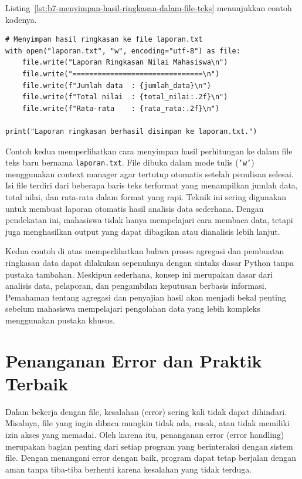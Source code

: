 Listing~\ref{lst:b7-menyimpan-hasil-ringkasan-dalam-file-teks} menunjukkan contoh kodenya.

\begin{lstlisting}[style=PythonStyle, caption={Menyimpan hasil ringkasan dalam file teks terformat}, label={lst:b7-menyimpan-hasil-ringkasan-dalam-file-teks}]
# Menyimpan hasil ringkasan ke file laporan.txt
with open("laporan.txt", "w", encoding="utf-8") as file:
    file.write("Laporan Ringkasan Nilai Mahasiswa\n")
    file.write("===============================\n")
    file.write(f"Jumlah data  : {jumlah_data}\n")
    file.write(f"Total nilai  : {total_nilai:.2f}\n")
    file.write(f"Rata-rata    : {rata_rata:.2f}\n")

print("Laporan ringkasan berhasil disimpan ke laporan.txt.")
\end{lstlisting}

Contoh kedua memperlihatkan cara menyimpan hasil perhitungan ke dalam file teks baru bernama \texttt{laporan.txt}. File dibuka dalam mode tulis (\texttt{'w'}) menggunakan context manager agar tertutup otomatis setelah penulisan selesai. Isi file terdiri dari beberapa baris teks terformat yang menampilkan jumlah data, total nilai, dan rata-rata dalam format yang rapi. Teknik ini sering digunakan untuk membuat laporan otomatis hasil analisis data sederhana. Dengan pendekatan ini, mahasiswa tidak hanya mempelajari cara membaca data, tetapi juga menghasilkan output yang dapat dibagikan atau dianalisis lebih lanjut.

Kedua contoh di atas memperlihatkan bahwa proses agregasi dan pembuatan ringkasan data dapat dilakukan sepenuhnya dengan sintaks dasar Python tanpa pustaka tambahan. Meskipun sederhana, konsep ini merupakan dasar dari analisis data, pelaporan, dan pengambilan keputusan berbasis informasi. Pemahaman tentang agregasi dan penyajian hasil akan menjadi bekal penting sebelum mahasiswa mempelajari pengolahan data yang lebih kompleks menggunakan pustaka khusus.


\section{Penanganan Error dan Praktik Terbaik}

Dalam bekerja dengan file, kesalahan (error) sering kali tidak dapat dihindari. Misalnya, file yang ingin dibaca mungkin tidak ada, rusak, atau tidak memiliki izin akses yang memadai. Oleh karena itu, penanganan error (error handling) merupakan bagian penting dari setiap program yang berinteraksi dengan sistem file. Dengan menangani error dengan baik, program dapat tetap berjalan dengan aman tanpa tiba-tiba berhenti karena kesalahan yang tidak terduga.

